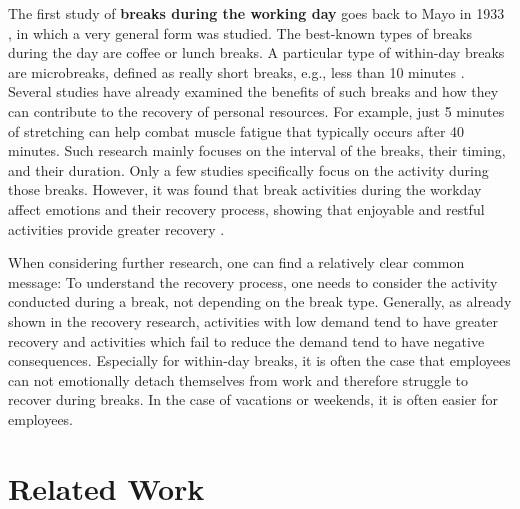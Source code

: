 \documentclass{hasel_thesis}
\begin{document}
The first study of \textbf{breaks during the working day} goes back to Mayo in 1933 \cite{Mayo.1933}, in which a very general form was studied. The best-known types of breaks during the day are coffee or lunch breaks. A particular type of within-day breaks are microbreaks, defined as really short breaks, e.g., less than 10 minutes \cite{BennettAndrewA.GabrielAllisonS.CalderwoodCharles.2020}. Several studies have already examined the benefits of such breaks and how they can contribute to the recovery of personal resources. For example, just 5 minutes of stretching can help combat muscle fatigue that typically occurs after 40 minutes. Such research mainly focuses on the interval of the breaks, their timing, and their duration. Only a few studies specifically focus on the activity during those breaks. However, it was found that break activities during the workday affect emotions and their recovery process, showing that enjoyable and restful activities provide greater recovery \cite{Trougakos2008}. 

When considering further research, one can find a relatively clear common message: To understand the recovery process, one needs to consider the activity conducted during a break, not depending on the break type. Generally, as already shown in the recovery research, activities with low demand tend to have greater recovery and activities which fail to reduce the demand tend to have negative consequences. Especially for within-day breaks, it is often the case that employees can not emotionally detach themselves from work and therefore struggle to recover during breaks. In the case of vacations or weekends, it is often easier for employees.



\chapter{Related Work} \label{related_work}

\end{document}
